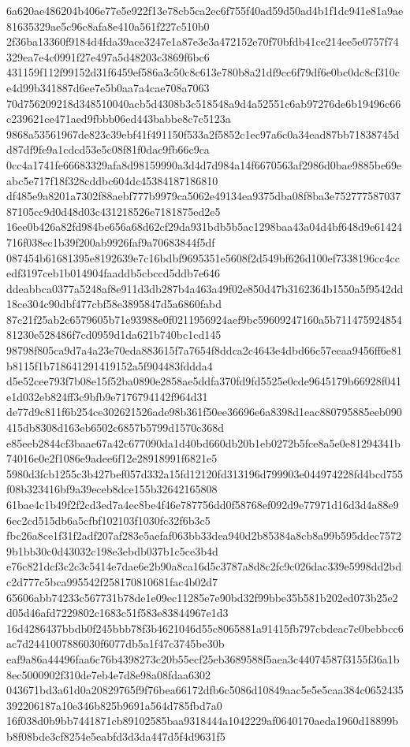 \documentclass[11pt,a4paper]{article}
\begin{document}
{6a620ae486204b406e77e5e922f13e78cb5ca2ec6f755f40ad59d50ad4b1f1dc941e81a9ae81635329ae5c96c8afa8e410a561f227c510b0
2f36ba13360f9184d4fda39ace3247e1a87e3e3a472152e70f70bfdb41ce214ee5e0757f74329ea7e4c0991f27e497a5d48203c3869f6bc6
431159f112f99152d31f6459ef586a3c50c8c613e780b8a21df9cc6f79df6e0bc0dc8cf310ce4d99b341887d6ee7e5b0aa7a4cae708a7063
70d756209218d348510040acb5d4308b3c518548a9d4a52551c6ab97276de6b19496c66c239621ce471aed9fbbb06ed443babbe8c7c5123a
9868a53561967de823c39ebf41f491150f533a2f5852c1ec97a6c0a34ead87bb71838745dd87df9fe9a1cdcd53e5c08f81f0dac9fb66c9ca
0cc4a1741fe66683329afa8d98159990a3d4d7d984a14f6670563af2986d0bae9885be69eabc5e717f18f328cddbc604dc45384187186810
df485e9a8201a7302f88aebf777b9979ca5062e49134ea9375dba08f8ba3e75277758703787105cc9d0d48d03c431218526e7181875ed2e5
16ee0b426a82fd984be656a68d62cf29da931bdb5b5ac1298baa43a04d4bf648d9e61424716f038ec1b39f200ab9926faf9a70683844f5df
087454b61681395e8192639e7c16bdbf9695351e5608f2d549bf626d100ef7338196cc4ccedf3197ceb1b014904faaddb5cbccd5ddb7e646
ddeabbca0377a5248af8e911d3db287b4a463a49f02e850d47b3162364b1550a5f9542dd18ce304c90dbf477cbf58e3895847d5a6860fabd
87c21f25ab2c6579605b71e93988e0f0211956924aef9bc59609247160a5b71147592485481230e528486f7cd0959d1da621b740bc1cd145
98798f805ca9d7a4a23e70eda883615f7a7654f8ddca2c4643e4dbd66c57eeaa9456ff6e81b8115f1b718641291419152a5f904483fddda4
d5e52cee793f7b08e15f52ba0890e2858ae5ddfa370fd9fd5525e0cde9645179b66928f041e1d032eb824ff3c9bfb9e7176794142f964d31
de77d9c811f6b254ce302621526ade98b361f50ee36696e6a8398d1eac880795885eeb090415db8308d163eb6502c6857b5799d1570c368d
e85eeb2844cf3baae67a42c677090da1d40bd660db20b1eb0272b5fce8a5e0e81294341b74016e0e2f1086e9adee6f12e28918991f6821e5
5980d3fcb1255c3b427bef057d332a15fd12120fd313196d799903e044974228fd4bcd755f08b323416bf9a39eceb8dce155b32642165808
61bae4c1b49f2f2cd3ed7a4ec8be4f46e787756dd0f58768ef092d9e77971d16d3d4a88e96ec2cd515db6a5cfbf102103f1030fc32f6b3c5
fbc26a8ce1f31f2adf207af283e5aefaf063bb33dea940d2b85384a8cb8a99b595ddec75729b1bb30c0d43032c198e3ebdb037b1c5ce3b4d
e76c821dcf3c2c3c5414e7dae6e2b90a8ca16d5c3787a8d8c2fc9c026dac339e5998dd2bdc2d777c5bca995542f258170810681fac4b02d7
65606abb74233c567731b78de1e09ec11285e7e90bd32f99bbe35b581b202ed073b25e2d05d46afd7229802c1683c51f583e83844967e1d3
16d4286437bbdb0f245bbb78f3b4621046d55c8065881a91415fb797cbdeac7c0bebbcc6ac7d2441007886030f6077db5a1f47c3745be30b
eaf9a86a44496faa6c76b4398273c20b55ecf25eb3689588f5aea3c44074587f3155f36a1b8ec5000902f310de7eb4e7d8e98a08fdaa6302
043671bd3a61d0a20829765f9f76bea66172dfb6c5086d10849aac5e5e5caa384c0652435392206187a10e346b825b9691a564d785fbd7a0
16f038d0b9bb7441871cb89102585baa9318444a1042229af0640170aeda1960d18899bb8f08bde3cf8254e5eabfd3d3da447d5f4d9631f5
}
\end{document}
